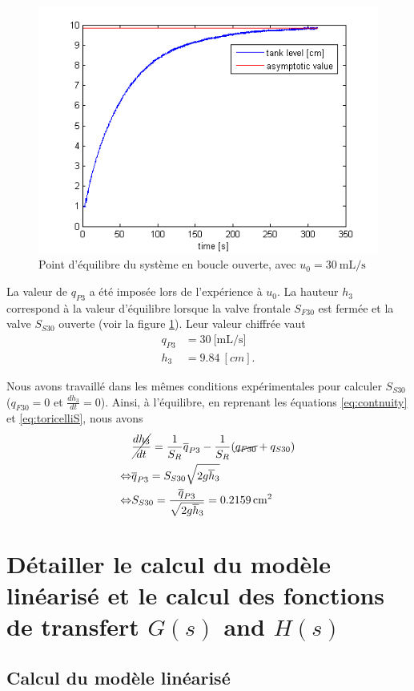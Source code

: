 \documentclass[frenchb, paper=a4, fontsize=11pt]{scrartcl}
\newcommand*\eq[1]{\overline{#1}} 				%
\numberwithin{equation}{section}					%
\numberwithin{figure}{section}					%
\numberwithin{table}{section}						%
\begin{document}
\begin{figure}[!ht]
	\centering
	\includegraphics[width=0.6\linewidth]{img/exp1_ol.png}
	\caption{Point d'équilibre du système en boucle ouverte, avec $u_0 = \SI{30}{\milli\liter\per\second}$}
	\label{fig:exp1_ol}
\end{figure}


La valeur de $q_{P3}$ a été imposée lors de l'expérience à $u_0$. La hauteur $h_3$ correspond à la valeur d'équilibre lorsque la valve frontale $S_{F30}$ est fermée et la valve $S_{S30}$ ouverte (voir la figure \ref{fig:exp1_ol}). Leur valeur chiffrée vaut
\begin{align}
q_{P3} & = \SI{30}{[\milli\liter\per\second]}\\
h_3 & = \SI{9.84}{[cm]}.
\end{align}

Nous avons travaillé dans les mêmes conditions expérimentales pour calculer $S_{S30}$ ($q_{F30} = 0$ et $\frac{dh_3}{dt} = 0$). Ainsi, à l'équilibre, en reprenant les équations \ref{eq:contnuity} et \ref{eq:toricelliS}, nous avons
\begin{align}
&\cancel{\frac{dh_3}{dt}} = \frac{1}{S_R}\eq{q}_{P3} - \frac{1}{S_R}(\cancel{q_{F30}}+q_{S30})\\
\Leftrightarrow & \eq{q}_{P3} = S_{S30} \sqrt{2g\eq{h}_3} \\
\Leftrightarrow & S_{S30} = \frac{\eq{q}_{P3}}{ \sqrt{2g\eq{h}_3}} = \SI{0.2159}{cm^2}
\end{align}

\section{Détailler le calcul du modèle linéarisé et le calcul des fonctions de transfert $G(s)$ and $H(s)$}

\subsection{Calcul du modèle linéarisé}
\end{document}

